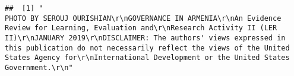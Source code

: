 \documentclass[
]{article}
\begin{document}
\begin{verbatim}
##  [1] "                                                                                                                                  PHOTO BY SEROUJ OURISHIAN\r\nGOVERNANCE IN ARMENIA\r\nAn Evidence Review for Learning, Evaluation and\r\nResearch Activity II (LER II)\r\nJANUARY 2019\r\nDISCLAIMER: The authors' views expressed in this publication do not necessarily reflect the views of the United States Agency for\r\nInternational Development or the United States Government.\r\n"                                                                                                                                                                                                                                                                                                                                                                                                                                                                                                                                                                                                                                                                                                                                                                                                                                                                                                                                                                                                                                                                                                                                                                                                                                                                                                                                                                                                                                                                                                                                                                                                                                                                                                                                                                                                                                                                                                                                                                                                                                                                                                                                                                                                                                                                                                                                                                                                                                                                                                                                                                                                                                                                                                                                                                                                                                                                              
\end{verbatim}
\end{document}
